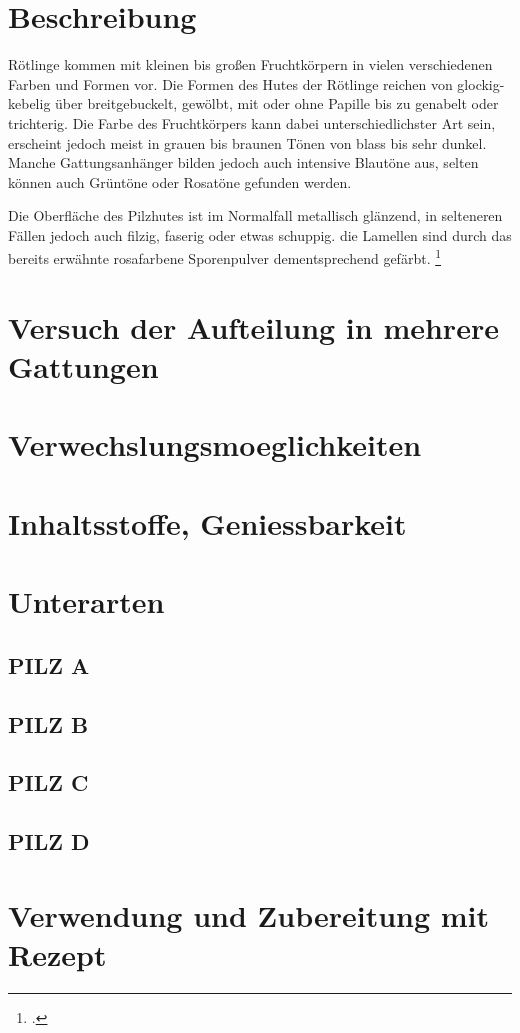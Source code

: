 \documentclass[a4paper,abstracton]{scrreprt}
\begin{document}
\section{Beschreibung}
Rötlinge kommen mit kleinen bis großen Fruchtkörpern in vielen verschiedenen Farben und Formen vor. Die Formen des Hutes der Rötlinge reichen von glockig-kebelig über breitgebuckelt, gewölbt, mit oder ohne Papille bis zu genabelt oder trichterig. Die Farbe des Fruchtkörpers kann dabei unterschiedlichster Art sein, erscheint jedoch meist in grauen bis braunen Tönen von blass bis sehr dunkel. Manche Gattungsanhänger bilden jedoch auch intensive Blautöne aus, selten können auch Grüntöne oder Rosatöne gefunden werden. 

Die Oberfläche des Pilzhutes ist im Normalfall metallisch glänzend, in selteneren Fällen jedoch auch filzig, faserig oder etwas schuppig. die Lamellen sind durch das bereits erwähnte rosafarbene Sporenpulver dementsprechend gefärbt.
\footcite{beschreibung}

\section{Versuch der Aufteilung in mehrere Gattungen}
\section{Verwechslungsmoeglichkeiten}
\section{Inhaltsstoffe, Geniessbarkeit}
\section{Unterarten}
\subsection{PILZ A}
\subsection{PILZ B}
\subsection{PILZ C}
\subsection{PILZ D}
\section{Verwendung und Zubereitung mit Rezept}

\printbibliography
\end{document}
